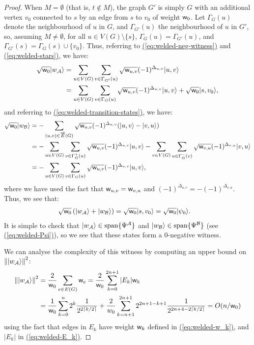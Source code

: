 \documentclass{theoretics}
\newcommand{\eq}[1]{\hyperref[eq:#1]{(\ref*{eq:#1})}}
\def\ket#1{{\lvert}#1\rangle}
\renewcommand{\>}{\rangle}
\newcommand{\<}{\langle}
\renewcommand{\(}{\left(}
\renewcommand{\)}{\right)}
\def\norm#1{\left\| #1 \right\|}
\def\w{{\sf w}}
\begin{document}
\begin{proof}
When $M=\emptyset$ (that is, $t\not\in M$), the graph $G'$ is simply $G$ with an additional vertex $v_0$ connected to $s$ by an edge from $s$ to $v_0$ of weight $\w_0$. 
Let $\Gamma_G(u)$ denote the neighbourhood of $u$ in $G$, and $\Gamma_{G'}(u)$ the neighbourhood of $u$ in $G'$, so, assuming $M\neq \emptyset$, for all $u\in V(G)\setminus \{s\}$, $\Gamma_G(u)=\Gamma_{G'}(u)$, and $\Gamma_{G'}(s)=\Gamma_G(s)\cup\{v_0\}$.
Thus, referring to \eq{welded-neg-witness} and \eq{welded-stars}, we have: 
\begin{align*}
\sqrt{\w_0}\ket{w_{\cal A}} &= \sum_{u\in V(G)}\sum_{v\in\Gamma_{G'}(u)}\sqrt{\w_{u,v}}(-1)^{\Delta_{u,v}}\ket{u,v}\\
&=\sum_{u\in V(G)}\sum_{v\in\Gamma_G(u)}\sqrt{\w_{u,v}}(-1)^{\Delta_{u,v}}\ket{u,v}+\sqrt{\w_0}\ket{s,v_0},
\end{align*}
and referring to \eq{welded-transition-states}, we have:
\begin{align*}
\sqrt{\w_0}\ket{w_{\cal B}} &= -\sum_{(u,v)\in \overrightarrow{E}(G)}\sqrt{\w_{u,v}}(-1)^{\Delta_{u,v}}(\ket{u,v}-\ket{v,u})\\
&= -\sum_{u\in V(G)}\sum_{v\in\Gamma_G^+(u)}\sqrt{\w_{u,v}}(-1)^{\Delta_{u,v}}\ket{u,v}-\sum_{v\in V(G)}\sum_{u\in \Gamma_G^-(v)}\sqrt{\w_{v,u}}(-1)^{\Delta_{v,u}}\ket{v,u}\\
&=-\sum_{u\in V(G)}\sum_{v\in\Gamma_G(u)}\sqrt{\w_{u,v}}(-1)^{\Delta_{u,v}}\ket{u,v},
\end{align*}
where we have used the fact that $\w_{u,v}=\w_{v,u}$ and $(-1)^{\Delta_{u,v}}=-(-1)^{\Delta_{v,u}}$.
 Thus, we see that:
\begin{align*}
\sqrt{\w_0}\left(\ket{w_{\cal A}}+\ket{w_{\cal B}}\right) &= \sqrt{\w_0}\ket{s,v_0}=\sqrt{\w_0}\ket{\psi_0}. 
\end{align*}
It is simple to check that $\ket{w_{\cal A}}\in \mathrm{span}\{\Psi^{\cal A}\}$ and $\ket{w_{\cal B}}\in \mathrm{span}\{\Psi^{\cal B}\}$ (see \eq{welded-Psi}), so we see that these states form a 0-negative witness. 

We can analyse the complexity of this witness by computing an upper bound on $\norm{\ket{w_{\cal A}}}^2$:
\begin{align*}
\norm{\ket{w_{\cal A}}}^2 &= \frac{2}{\w_0}\sum_{e\in E(G)}\w_e = \frac{2}{\w_0}\sum_{k=0}^{2n+1}|E_k|\w_k\\
&=\frac{1}{\w_0}\sum_{k=0}^{n}2^{k}\frac{1}{2^{2\lceil k/2\rceil}}+\frac{2}{w_0}\sum_{k=n+1}^{2n+1}2^{2n+1-k+1}\frac{1}{2^{2n+4-2\lceil k/2\rceil}}=O(n/\w_0)\label{eq:welded-trees-neg}
\end{align*}
using the fact that edges in $E_k$ have weight $\w_k$ defined in \eq{welded-w_k}, and $|E_k|$ in \eq{welded-E_k}.
\end{proof}
\end{document}
